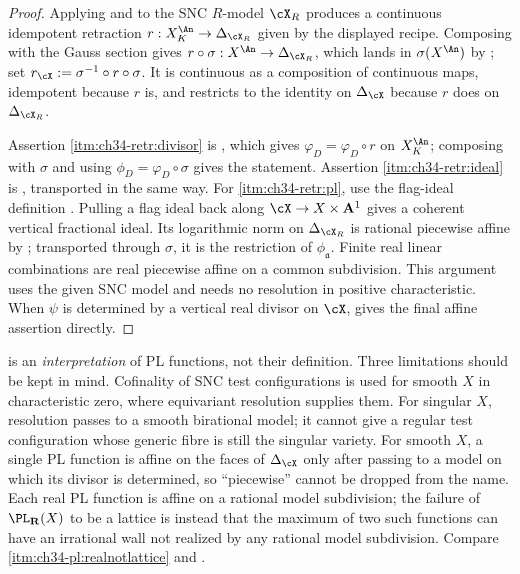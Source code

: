 \begin{proof}
Applying  and
 to the SNC $R$-model $\cX_R$ produces a
continuous idempotent retraction
$r:X_K^{\An}\to\Delta_{\cX_R}$ given by the displayed recipe.  Composing
with the Gauss section gives $r\circ\sigma:X^{\An}\to\Delta_{\cX_R}$,
which lands in $\sigma(X^{\An})$ by ; set
$r_{\cX}:=\sigma^{-1}\circ r\circ\sigma$.  It is continuous as a
composition of continuous maps, idempotent because $r$ is, and restricts
to the identity on $\Delta_{\cX}$ because $r$ does on
$\Delta_{\cX_R}$.

Assertion \cref{itm:ch34-retr:divisor} is ,
which gives $\varphi_D=\varphi_D\circ r$ on $X_K^{\An}$; composing with
$\sigma$ and using $\phi_D=\varphi_D\circ\sigma$ gives the statement.
Assertion \cref{itm:ch34-retr:ideal} is
, transported in the same way.
For \cref{itm:ch34-retr:pl}, use the flag-ideal definition
.  Pulling a flag ideal back along
$\cX\to X\times\mathbf A^1$ gives a coherent vertical fractional ideal.
Its logarithmic norm on $\Delta_{\cX_R}$ is rational piecewise affine by
; transported through $\sigma$, it is the
restriction of $\phi_{\mathfrak a}$.  Finite real linear combinations
are real piecewise affine on a common subdivision.  This argument uses
the given SNC model and needs no resolution in positive characteristic.
When $\psi$ is determined by a vertical real divisor on $\cX$,
 gives the final affine assertion directly.
\end{proof}

\begin{remark}
\label{rem:ch34-dual-complex-scope}
 is an \emph{interpretation} of PL functions, not
their definition.  Three limitations should be kept in mind.
Cofinality of SNC test configurations is used for smooth $X$ in
characteristic zero, where equivariant resolution supplies them.
For singular $X$, resolution passes to a smooth birational model;
it cannot give a regular test configuration whose generic fibre is
still the singular variety.  For smooth $X$, a single PL function is affine on the faces
of $\Delta_{\cX}$ only after passing to a model on which its divisor is
determined, so ``piecewise'' cannot be dropped from the name.  Each real PL
function is affine on a rational model subdivision; the failure of
$\PL_{\mathbf R}(X)$ to be a lattice is instead that the maximum of two
such functions can have an irrational wall not realized by any rational
model subdivision.  Compare
\,\cref{itm:ch34-pl:realnotlattice} and
.
\end{remark}


